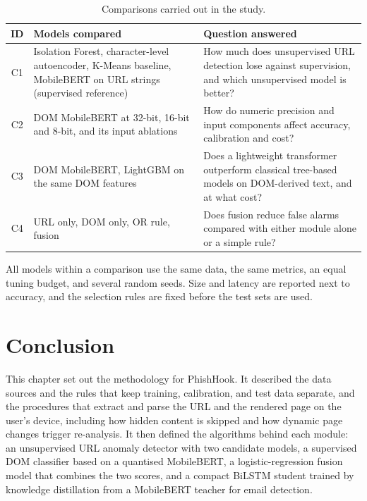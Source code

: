 \documentclass{FastFyp}
\begin{document}
\begin{table}[!ht]
\centering
\caption{Comparisons carried out in the study.}
\label{tab:comparisons}
\begin{tabularx}{\textwidth}{|c|>{\raggedright\arraybackslash}X|>{\raggedright\arraybackslash}X|}
\hline
\textbf{ID} & \textbf{Models compared} & \textbf{Question answered} \\
\hline
C1 & Isolation Forest, character-level autoencoder, K-Means baseline, MobileBERT on URL strings (supervised reference) & How much does unsupervised URL detection lose against supervision, and which unsupervised model is better? \\
\hline
C2 & DOM MobileBERT at 32-bit, 16-bit and 8-bit, and its input ablations & How do numeric precision and input components affect accuracy, calibration and cost? \\
\hline
C3 & DOM MobileBERT, LightGBM on the same DOM features & Does a lightweight transformer outperform classical tree-based models on DOM-derived text, and at what cost? \\
\hline
C4 & URL only, DOM only, OR rule, fusion & Does fusion reduce false alarms compared with either module alone or a simple rule? \\
\hline
\end{tabularx}
\end{table}

All models within a comparison use the same data, the same metrics, an equal tuning budget, and several random seeds. Size and latency are reported next to accuracy, and the selection rules are fixed before the test sets are used.

\section{Conclusion}
\label{sec:method-conclusion}
This chapter set out the methodology for PhishHook. It described the data sources and the rules that keep training, calibration, and test data separate, and the procedures that extract and parse the URL and the rendered page on the user's device, including how hidden content is skipped and how dynamic page changes trigger re-analysis. It then defined the algorithms behind each module: an unsupervised URL anomaly detector with two candidate models, a supervised DOM classifier based on a quantised MobileBERT, a logistic-regression fusion model that combines the two scores, and a compact BiLSTM student trained by knowledge distillation from a MobileBERT teacher for email detection.
\end{document}
